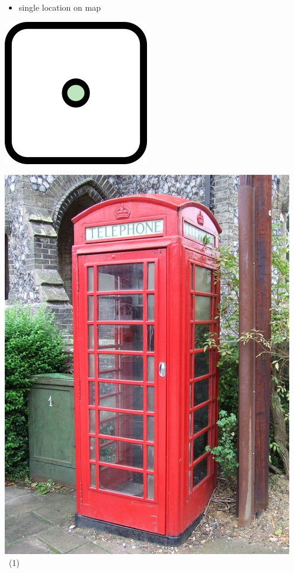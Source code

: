 \documentclass{beamer}
\begin{document}
	\begin{frame}
		\begin{itemize}
			\item single location on map
		\end{itemize}
		
		\vfill
		
		\begin{center}
			\begin{minipage}[b][0.6\textheight][c]{0.2\linewidth}
				\centering
				\includegraphics[width=0.5\linewidth,height=0.5\textheight,keepaspectratio]{images/240px-Mf_node.png}
			\end{minipage}
			\begin{minipage}[b][0.6\textheight][c]{0.4\linewidth}
				\centering
				\includegraphics[width=0.8\linewidth,height=0.8\textheight,keepaspectratio]{images/red-telephone-box-uk.jpg}~\tiny{(1)}

\end{minipage}
\end{center}
\end{frame}
\end{document}
